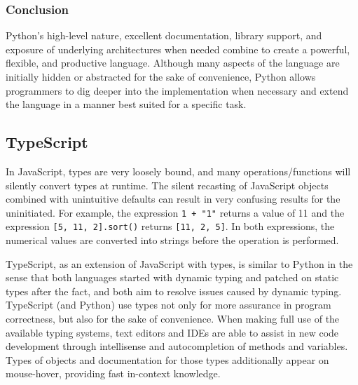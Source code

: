 \documentclass{article}
\begin{document}
\subsubsection{Conclusion}

Python's high-level nature, excellent documentation, library support, and exposure of underlying architectures when needed
combine to create a powerful, flexible, and productive language. Although many aspects of the language are initially
hidden or abstracted for the sake of convenience, Python allows programmers to dig deeper into the implementation
when necessary and extend the language in a manner best suited for a specific task.

\subsection{TypeScript}

In JavaScript, types are very loosely bound, and many operations/functions will silently convert types
at runtime. The silent recasting of JavaScript objects combined with unintuitive defaults
can result in very confusing results for the uninitiated. For example, the expression \texttt{1 + "1"}
returns a value of 11 and the expression \texttt{[5, 11, 2].sort()} returns
\texttt{[11, 2, 5]}. In both expressions, the numerical values are converted into strings before the operation is performed.

TypeScript, as an extension of JavaScript with types, is similar to Python in the sense that both
languages started with dynamic typing and patched on static types after the fact, and both aim to resolve issues caused
by dynamic typing. TypeScript (and Python) use types not only for more assurance in program correctness,
but also for the sake of convenience. When making full use of the available typing systems, text editors
and IDEs are able to assist in new code development through intellisense and autocompletion of methods and variables.
Types of objects and documentation for those types additionally appear on mouse-hover, providing fast in-context knowledge.
\end{document}
